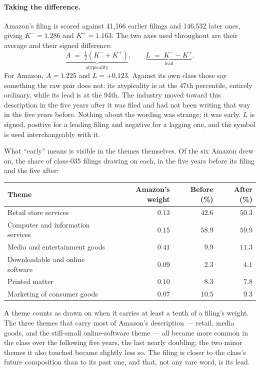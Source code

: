 \paragraph{Taking the difference.} Amazon's filing is scored against 41{,}166
earlier filings and 146{,}532 later ones, giving $K^{-} = 1.286$ and
$K^{+} = 1.163$. The two axes used throughout are their average and their
signed difference:
\[
  \underbrace{A \;=\; \tfrac{1}{2}\left(K^{-} + K^{+}\right)}_{\text{atypicality}},
  \qquad
  \underbrace{L \;=\; K^{-} - K^{+}}_{\text{lead}} .
\]
For Amazon, $A = 1.225$ and $L = +0.123$. Against its own class those say
something the raw pair does not: its atypicality is at the 47th percentile,
entirely ordinary, while its lead is at the 94th. The industry moved toward
this description in the five years after it was filed and had not been writing
that way in the five years before. Nothing about the wording was strange; it
was early. $L$ is signed, positive for a leading filing and negative for a
lagging one, and the symbol \dkl{} is used interchangeably with it.

What ``early'' means is visible in the themes themselves. Of the six Amazon
drew on, the share of class-035 filings drawing on each, in the five years
before its filing and the five after:

\begin{center}\small
\begin{tabular}{lrrr}
\toprule
Theme & Amazon's weight & Before (\%) & After (\%) \\
\midrule
Retail store services              & $0.13$ & $42.6$ & $50.3$ \\
Computer and information services  & $0.15$ & $58.9$ & $59.9$ \\
Media and entertainment goods      & $0.41$ & $9.9$  & $11.3$ \\
Downloadable and online software   & $0.09$ & $2.3$  & $4.1$  \\
Printed matter                     & $0.10$ & $8.3$  & $7.8$  \\
Marketing of consumer goods        & $0.07$ & $10.5$ & $9.3$  \\
\bottomrule
\end{tabular}
\end{center}

\noindent A theme counts as drawn on when it carries at least a tenth of a
filing's weight. The three themes that carry most of Amazon's description ---
retail, media goods, and the still-small online-software theme --- all became
more common in the class over the following five years, the last nearly
doubling; the two minor themes it also touched became slightly less so. The
filing is closer to the class's future composition than to its past one, and
that, not any rare word, is its lead.

